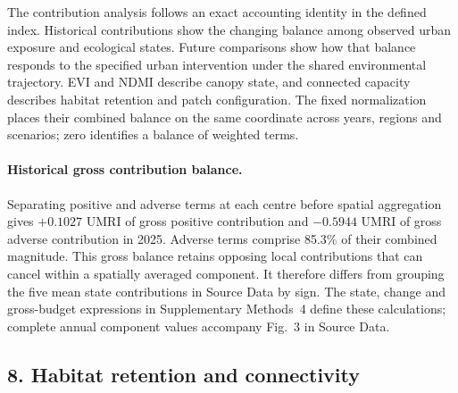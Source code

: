 The contribution analysis follows an exact accounting identity in the defined index. Historical contributions show the changing balance among observed urban exposure and ecological states. Future comparisons show how that balance responds to the specified urban intervention under the shared environmental trajectory. EVI and NDMI describe canopy state, and connected capacity describes habitat retention and patch configuration. The fixed normalization places their combined balance on the same coordinate across years, regions and scenarios; zero identifies a balance of weighted terms.


\paragraph{Historical gross contribution balance.}
Separating positive and adverse terms at each centre before spatial aggregation gives $+0.1027$ UMRI of gross positive contribution and $-0.5944$ UMRI of gross adverse contribution in 2025. Adverse terms comprise 85.3\% of their combined magnitude. This gross balance retains opposing local contributions that can cancel within a spatially averaged component. It therefore differs from grouping the five mean state contributions in Source Data by sign. The state, change and gross-budget expressions in Supplementary Methods~4 define these calculations; complete annual component values accompany Fig.~3 in Source Data.


\subsection{8. Habitat retention and connectivity}
\label{note:retention}


